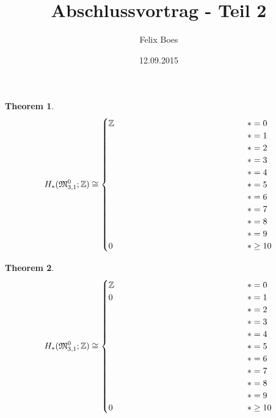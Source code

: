 \documentclass[12pt]{beamer}            %
\author{Felix Boes}
\title{Abschlussvortrag - Teil 2}
\subtitle{}
\date{12.09.2015}
\newcommand{\bldots}{\raisebox{.5ex}{\fbox{$\ldots$}}}
\newtheorem*{thm*}{Theorem}
\begin{document}
\begin{frame}
    {
        \begin{thm*}
        \[
            H_\ast( \mathfrak{M}_{3,1}^0; \mathbb Z ) \cong
            \begin{cases}
                \mathbb Z           & \ast = 0\\
                                   & \ast = 1\\
                \phantom{\mathbb Z \oplus \mathbb Z/2 \oplus \mathbb Z/3 \oplus \mathbb Z/4 \oplus \mathbb Z/7 \oplus \bldots }                                 & \ast = 2\\
                & \ast = 3\\
                & \ast = 4\\
                & \ast = 5\\
                & \ast = 6\\
                & \ast = 7\\
                & \ast = 8\\
                & \ast = 9\\
                0 & \ast \ge 10\\
            \end{cases}
        \]
        \end{thm*}
    }
    \pause
    {
        \begin{thm*}
        \[
            H_\ast( \mathfrak{M}_{3,1}^0; \mathbb Z ) \cong
            \begin{cases}
                \mathbb Z           & \ast = 0\\
                0                   & \ast = 1\\
                & \ast = 2\\
                \phantom{\mathbb Z \oplus \mathbb Z/2 \oplus \mathbb Z/3 \oplus \mathbb Z/4 \oplus \mathbb Z/7 \oplus \bldots} & \ast = 3\\
                & \ast = 4\\
                & \ast = 5\\
                & \ast = 6\\
                & \ast = 7\\
                & \ast = 8\\
                & \ast = 9\\
                0 & \ast \ge 10\\
            \end{cases}
        \]
        \end{thm*}
}
\end{frame}
\end{document}
